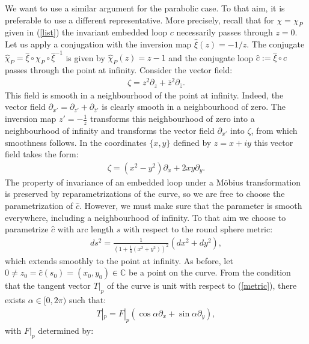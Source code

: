 We want to use a similar argument for the parabolic case. To that aim, it is 
preferable to use a different representative.
More precisely, recall that for $\chi = \chi_P$ given in 
(\ref{list}) the invariant embedded loop  $c$ necessarily passes
through $z=0$. Let us apply a conjugation
with the inversion map $\hat{\xi}(z) = -1/z$. The conjugate
$\widehat{\chi}_P = \hat{\xi} \circ \chi_P \circ \hat{\xi}^{-1}$ is given by
$\widehat{\chi}_P (z) = z -1$ and the conjugate loop
$\hat{c}:= \hat{\xi} \circ c$ passes through the point at infinity. 
Consider the vector field:
\begin{align*}
\zeta = z^2 \partial_z + \overline{z}^2 \partial_{\overline{z}}.
\end{align*}
This field is smooth in a neighbourhood of the point at infinity.
Indeed,
the vector field
$\partial_{x'} =
\partial_{z'} + \partial_{\overline{z}'}$ is clearly smooth in a neighbourhood
of zero. The inversion map $z' = - \frac{1}{z}$ transforms
this neighbourhood of zero into a neighbourhood of infinity and transforms
the vector field $\partial_{x'}$ into $\zeta$, from which smoothness follows.
In the coordinates $\{x,y\}$ defined by $z= x+ i y$ this vector
field takes the form:
\begin{align*}
\zeta = \left (x^2 - y^2 \right ) \partial_x + 2 xy \partial_y.
\end{align*}
The property of invariance of an embedded loop 
under a M\"obius transformation 
is
preserved by reparametrizations of the curve, so we are free to choose
the parametrization of $\hat{c}$. However,  we must make sure that the 
parameter is smooth everywhere, including a neighbourhood
of infinity. To that aim
we choose to parametrize $\hat{c}$ with
arc length $s$ with respect to the round sphere metric:
\begin{align}
ds^2 = \frac{1}{\left ( 1+ \frac{1}{4} (x^2 + y^2 ) \right )^2}
(dx^2 + dy^2),
\label{metric}
\end{align}
which extends smoothly to the point at infinity.
As before, let $0 \neq z_0= \hat{c}(s_0) = (x_0,y_0) \in \mathbb{C}$
be a point on the curve. 
From the condition that the  tangent vector
$T|_p$ of the curve is unit with respect to (\ref{metric}),
there exists $\alpha \in  [0,2\pi)$ such that:
\begin{align*}
T|_p = F|_p \left ( \cos \alpha \partial_x + \sin \alpha
\partial_y \right ),
\end{align*}
with $F|_p$ determined by:
